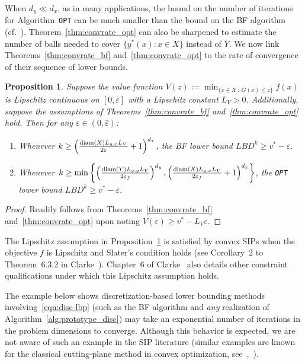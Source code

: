 \documentclass{article}
\newcommand{\1}[1]{\mathds{1}\left[#1\right]}
\newtheorem{proposition}[theorem]{Proposition}
\begin{document}
When $d_y \ll d_x$, as in many applications, the bound on the number of iterations for Algorithm~\texttt{OPT} can be much smaller than the bound on the BF algorithm (cf.\ \citep[Theorem~2]{still2001discretization}).
Theorem~\ref{thm:convrate_opt} can also be sharpened to estimate the number of balls needed to cover $\{y^*(x) : x \in X\}$ instead of $Y$.
We now link Theorems~\ref{thm:convrate_bf} and~\ref{thm:convrate_opt} to the rate of convergence of their sequence of lower bounds.


\begin{proposition}
\label{prop:calmness}
Suppose the value function $V(z) := \min_{\{x \in X \: : \: G(x) \leq z\}} f(x)$
is Lipschitz continuous on $[0,\bar{\varepsilon}]$ with a Lipschitz constant $L_V > 0$.
Additionally, suppose the assumptions of Theorems~\ref{thm:convrate_bf} and~\ref{thm:convrate_opt} hold.
Then for any $\varepsilon \in (0,\bar{\varepsilon})$:
\begin{enumerate}
\item Whenever $k \geq \left(\frac{\textup{diam}(X) L_{g,x} L_V}{2\varepsilon} + 1\right)^{d_x}$, the BF lower bound $LBD^k \geq v^* - \varepsilon$.

\item Whenever $k \geq \min\left\lbrace\left(\frac{\textup{diam}(Y) L_{g,y} L_V}{2\varepsilon_f}\right)^{d_y}, \left(\frac{\textup{diam}(X) L_{g,x} L_V}{2\varepsilon_f} + 1\right)^{d_x}\right\rbrace$, the \texttt{OPT} lower bound $LBD^k \geq v^* - \varepsilon$.
\end{enumerate}
\end{proposition}
\begin{proof}
Readily follows from Theorems~\ref{thm:convrate_bf} and~\ref{thm:convrate_opt} upon noting $V(\varepsilon) \geq v^* - L_V \varepsilon$.
\end{proof}



The Lipschitz assumption in Proposition~\ref{prop:calmness} is satisfied by convex SIPs when the objective $f$ is Lipschitz and Slater's condition holds (see Corollary~2 to Theorem~6.3.2 in Clarke~\cite{clarke1990optimization}).
Chapter~6 of Clarke~\cite{clarke1990optimization} also details other constraint qualifications under which this Lipschitz assumption holds.


The example below shows discretization-based lower bounding methods involving~\eqref{eqn:disc-lbp} (such as the BF algorithm and \textit{any} realization of Algorithm~\ref{alg:prototype_disc}) may take an exponential number of iterations in the problem dimensions to converge.
Although this behavior is expected, we are not aware of such an example in the SIP literature (similar examples are known for the classical cutting-plane method in convex optimization, see~\citep[Ex.\ 3.3.1]{nesterov2018lectures},~\citep[Ex.\ 1]{hijazi2014outer}).
\end{document}
